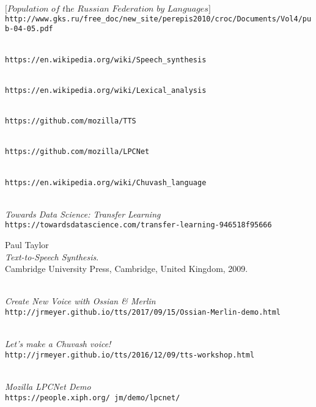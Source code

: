 \documentclass[fleqn,10pt]{SelfArx} %
\begin{document}
	\begin{thebibliography}{9}
		\\
		$\big[ \textit{Population of the Russian Federation by Languages} \big]$\\
		\texttt{http://www.gks.ru/free\_doc/new\_site/perepis2010/croc/Documents/Vol4/pub-04-05.pdf}
		
		\\
		\texttt{https://en.wikipedia.org/wiki/Speech\_synthesis}
		
		\\
		\texttt{https://en.wikipedia.org/wiki/Lexical\_analysis}
		
		\\
		\texttt{https://github.com/mozilla/TTS}
		
		\\
		\texttt{https://github.com/mozilla/LPCNet}
		
		\\
		\texttt{https://en.wikipedia.org/wiki/Chuvash\_language}
		
		\\
		\textit{Towards Data Science: Transfer Learning}\\
		\texttt{https://towardsdatascience.com/transfer-learning-946518f95666}
		
		Paul Taylor\\
		\textit{Text-to-Speech Synthesis}.\\
		Cambridge University Press, Cambridge, United Kingdom, 2009.
		
		\\
		\textit{Create New Voice with Ossian \& Merlin}\\
		\texttt{http://jrmeyer.github.io/tts/2017/09/15/Ossian-Merlin-demo.html}
		
		\\
		\textit{Let's make a Chuvash voice!}\\
		\texttt{http://jrmeyer.github.io/tts/2016/12/09/tts-workshop.html}
		
		\\
		\textit{Mozilla LPCNet Demo}\\
		\texttt{https://people.xiph.org/~jm/demo/lpcnet/}
	\end{thebibliography}
	
	
\end{document}
